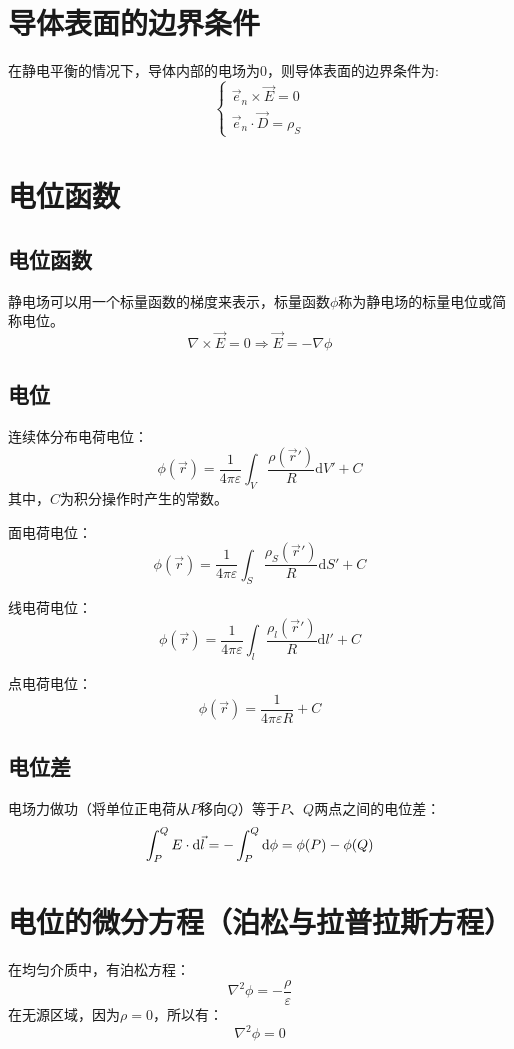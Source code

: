 \section{导体表面的边界条件}
在静电平衡的情况下，导体内部的电场为0，则导体表面的边界条件为:
$$\left\{
\begin{aligned}
\vec{e}_n \times \vec{E} = 0 \\
\vec{e}_n \cdot \vec{D} = \rho_S
\end{aligned}
\right.$$

\section{电位函数}
\subsection*{电位函数}
静电场可以用一个标量函数的梯度来表示，标量函数$\phi$称为静电场的标量电位或简称电位。
$$\nabla \times \vec{E} = 0 \Rightarrow \vec{E} = -\nabla\phi$$

\subsection*{电位}
连续体分布电荷电位：
$$\phi(\vec{r}) = \frac{1}{4\pi\varepsilon} \int_V \frac{\rho(\overrightarrow{r}')}{R}\mathrm{d}V' + C$$
其中，$C$为积分操作时产生的常数。

面电荷电位：
$$\phi(\vec{r}) = \frac{1}{4\pi\varepsilon} \int_S \frac{\rho_S(\overrightarrow{r}')}{R}\mathrm{d}S' + C$$

线电荷电位：
$$\phi(\vec{r}) = \frac{1}{4\pi\varepsilon} \int_l \frac{\rho_l(\overrightarrow{r}')}{R}\mathrm{d}l' + C$$

点电荷电位：
$$\phi(\vec{r}) = \frac{1}{4\pi\varepsilon R} + C$$

\subsection*{电位差}
电场力做功（将单位正电荷从$P$移向$Q$）等于$P$、$Q$两点之间的电位差：
$$\int_P^Q E  \cdot {\rm{d}}\vec l =  - \int_P^Q {{\rm{d}}\phi }  = \phi (P) - \phi (Q)$$

\section{电位的微分方程（泊松与拉普拉斯方程）}
在均匀介质中，有泊松方程：
$$\nabla^2 \phi = -\frac{\rho}{\varepsilon}$$
在无源区域，因为$\rho = 0$，所以有：
$$\nabla^2 \phi = 0$$

